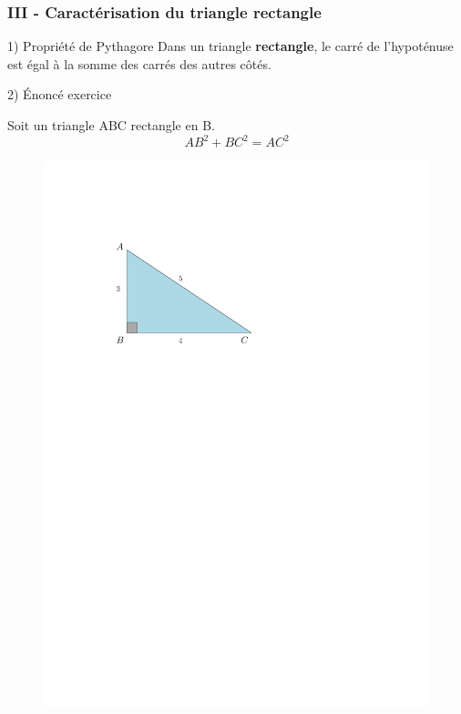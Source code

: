 \documentclass{beamer}
\begin{document}
\begin{frame}
  \frametitle{III - Caractérisation du triangle rectangle}

  \begin{block}{1) Propriété de Pythagore}
    Dans un triangle \textbf{rectangle}, le carré de l’hypoténuse est égal à la somme des carrés des autres 
côtés.
  \end{block}

  \begin{alertblock}{2) Énoncé exercice}
	\begin{multicols}{2}
    Soit un triangle ABC rectangle en B. 
	$$AB^2 + BC^2 = AC^2$$

	\begin{figure}[H]
	  \centering
	  \includegraphics[width=\linewidth]{sources/1/tri-pytha.pdf}
	\end{figure}

	\end{multicols}
  \end{alertblock}
\end{frame}
\end{document}
